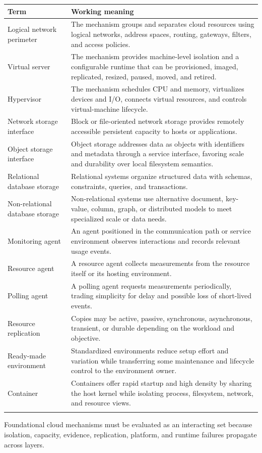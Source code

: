 \documentclass[11pt]{article}
\begin{document}
\begin{longtable}{@{}>{\RaggedRight\arraybackslash}p{}>{\RaggedRight\arraybackslash}p{}@{}}
\toprule\rowcolor{Navy}\color{white}\textbf{Term} & \color{white}\textbf{Working meaning}\\\midrule\endhead
Logical network perimeter & The mechanism groups and separates cloud resources using logical networks, address spaces, routing, gateways, filters, and access policies. \\\addlinespace[2pt]
Virtual server & The mechanism provides machine-level isolation and a configurable runtime that can be provisioned, imaged, replicated, resized, paused, moved, and retired. \\\addlinespace[2pt]
Hypervisor & The mechanism schedules CPU and memory, virtualizes devices and I/O, connects virtual resources, and controls virtual-machine lifecycle. \\\addlinespace[2pt]
Network storage interface & Block or file-oriented network storage provides remotely accessible persistent capacity to hosts or applications. \\\addlinespace[2pt]
Object storage interface & Object storage addresses data as objects with identifiers and metadata through a service interface, favoring scale and durability over local filesystem semantics. \\\addlinespace[2pt]
Relational database storage & Relational systems organize structured data with schemas, constraints, queries, and transactions. \\\addlinespace[2pt]
Non-relational database storage & Non-relational systems use alternative document, key-value, column, graph, or distributed models to meet specialized scale or data needs. \\\addlinespace[2pt]
Monitoring agent & An agent positioned in the communication path or service environment observes interactions and records relevant usage events. \\\addlinespace[2pt]
Resource agent & A resource agent collects measurements from the resource itself or its hosting environment. \\\addlinespace[2pt]
Polling agent & A polling agent requests measurements periodically, trading simplicity for delay and possible loss of short-lived events. \\\addlinespace[2pt]
Resource replication & Copies may be active, passive, synchronous, asynchronous, transient, or durable depending on the workload and objective. \\\addlinespace[2pt]
Ready-made environment & Standardized environments reduce setup effort and variation while transferring some maintenance and lifecycle control to the environment owner. \\\addlinespace[2pt]
Container & Containers offer rapid startup and high density by sharing the host kernel while isolating process, filesystem, network, and resource views. \\\addlinespace[2pt]
\bottomrule
\end{longtable}
\begin{takeawaybox}
Foundational cloud mechanisms must be evaluated as an interacting set because isolation, capacity, evidence, replication, platform, and runtime failures propagate across layers.
\end{takeawaybox}
\end{document}
